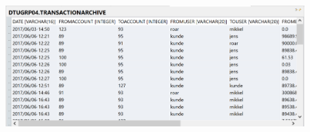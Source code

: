 \begin{figure}[H]
    \centering
    \includegraphics[width=\textwidth]{figures/transactionarchiveTable.PNG}
    \label{fig:transactionarchiveTable}
\end{figure}
